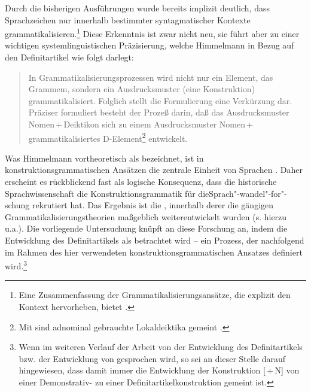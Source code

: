 Durch die bisherigen Ausführungen wurde bereits implizit deutlich, dass Sprachzeichen nur innerhalb bestimmter syntagmatischer Kontexte grammatikalisieren.\footnote{Eine Zusammenfassung der Grammatikalisierungsansätze, die explizit den Kontext hervorheben, bietet \textcite{Traugott2003,Traugott2008a}.} 
Diese Erkenntnis ist zwar nicht neu, sie führt aber zu einer wichtigen systemlinguistischen Präzisierung, welche Himmelmann in Bezug auf den Definitartikel wie folgt darlegt: \blockcquote[31]{Himmelmann1997}{In Grammatikalisierungsprozessen wird nicht nur ein Element, das Grammem, sondern ein Ausdrucksmuster (eine Konstruktion) grammatikalisiert. Folglich stellt die Formulierung  eine Verkürzung dar. Präziser formuliert besteht der Prozeß darin, daß das Ausdrucksmuster Nomen\,+\,Deiktikon sich zu einem Ausdrucksmuster Nomen\,+\,grammatikalisiertes D-Element\footnote{Mit  sind adnominal gebrauchte Lokaldeiktika gemeint \parencite[6]{Himmelmann1997}.} 
 entwickelt.} 
Was Himmelmann vortheoretisch als  bezeichnet, ist in kon\-struk\-tions\-grammatischen Ansätzen die zentrale Einheit von Sprachen \parencite[s. u.a.][]{Goldberg1995,Goldberg2006}. Daher erscheint es rückblickend fast als logische Konsequenz, dass die historische Sprachwissenschaft die Konstruktionsgrammatik für die\linebreak Sprach"-wandel"-for"-schung rekrutiert hat. Das Ergebnis ist die  \parencite[vgl. u.a.][]{Barddal2015}, innerhalb derer die gängigen Grammatikalisierungstheorien maßgeblich weiterentwickelt wurden (s. hierzu u.a.\citealt{Traugott2003,Bergs2008,Diewald2008,Fried2013,Traugott2013}). Die vorliegende Untersuchung knüpft an diese Forschung an, indem die Entwicklung des Definitartikels als  betrachtet wird -- ein Prozess, der nachfolgend im Rahmen des hier verwendeten konstruktionsgrammatischen Ansatzes definiert wird.\footnote{Wenn im weiteren Verlauf der Arbeit von der Entwicklung des Definitartikels bzw. der Entwicklung von  gesprochen wird, so sei an dieser Stelle darauf hingewiesen, dass damit immer die Entwicklung der Konstruktion [\,+\,N] von einer Demonstrativ- zu einer Definitartikelkonstruktion gemeint ist.}  

